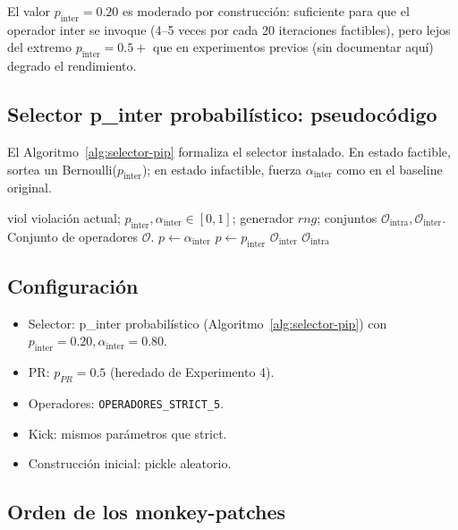 \documentclass[11pt,a4paper]{article}
\theoremstyle{definition}
\theoremstyle{remark}
\newcommand{\viol}{\text{viol}}
\begin{document}
El valor $p_{\text{inter}} = 0.20$ es moderado por construcción:
suficiente para que el operador inter se invoque (4--5 veces por cada
20 iteraciones factibles), pero lejos del extremo $p_{\text{inter}} =
0.5+$ que en experimentos previos (sin documentar aquí) degrado el
rendimiento.

\subsection{Selector p\_inter probabilístico: pseudocódigo}

El Algoritmo~\ref{alg:selector-pip} formaliza el selector instalado.
En estado factible, sortea un Bernoulli($p_{\text{inter}}$); en estado
infactible, fuerza $\alpha_{\text{inter}}$ como en el baseline original.

\begin{algorithm}[h]
\caption{Selector p\_inter probabilístico.}
\label{alg:selector-pip}
\begin{algorithmic}[1]
\Require $\viol$ violación actual; $p_{\text{inter}}, \alpha_{\text{inter}} \in [0,1]$;
  generador $rng$; conjuntos $\mathcal{O}_{\text{intra}}, \mathcal{O}_{\text{inter}}$.
\Ensure Conjunto de operadores $\mathcal{O}$.
\If{$\viol > 0$}
  \State $p \gets \alpha_{\text{inter}}$
\Else
  \State $p \gets p_{\text{inter}}$
\EndIf
{}
  \State \Return $\mathcal{O}_{\text{inter}}$
\Else
  \State \Return $\mathcal{O}_{\text{intra}}$
\EndIf
\end{algorithmic}
\end{algorithm}

\subsection{Configuración}

\begin{itemize}
\item Selector: p\_inter probabilístico (Algoritmo~\ref{alg:selector-pip})
  con $p_{\text{inter}} = 0.20, \alpha_{\text{inter}} = 0.80$.
\item PR: $p_{PR} = 0.5$ (heredado de Experimento 4).
\item Operadores: \texttt{OPERADORES\_STRICT\_5}.
\item Kick: mismos parámetros que strict.
\item Construcción inicial: pickle aleatorio.
\end{itemize}

\subsection{Orden de los monkey-patches}
\end{document}
